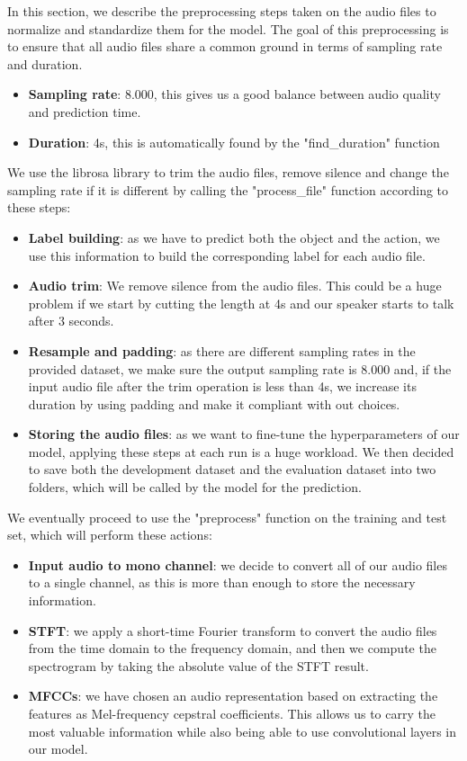 \documentclass[conference]{IEEEtran}
\begin{document}
In this section, we describe the preprocessing steps taken on the audio files to normalize and standardize them for the model. The goal of this preprocessing is to ensure that all audio files share a common ground in terms of sampling rate and duration.
\begin{itemize}
\item 	\textbf{Sampling rate}: 8.000, this gives us a good balance between audio quality and prediction time.
\item 	\textbf{Duration}: 4s, this is automatically found by the "find\_duration" function
\end{itemize}
We use the librosa library to trim the audio files, remove silence and change the sampling rate if it is different by calling the "process\_file" function according to these steps:
\begin{itemize}
\item 	\textbf{Label building}: as we have to predict both the object and the action, we use this information to build the corresponding label for each audio file.
\item 	\textbf{Audio trim}: We remove silence from the audio files. This could be a huge problem if we start by cutting the length at 4s and our speaker starts to talk after 3 seconds.
\item 	\textbf{Resample and padding}: as there are different sampling rates in the provided dataset, we make sure the output sampling rate is 8.000 and, if the input audio file after the trim operation is less than 4s, we increase its duration by using padding and make it compliant with out choices.
\item 	\textbf{Storing the audio files}: as we want to fine-tune the hyperparameters of our model, applying these steps at each run is a huge workload. We then decided to save both the development dataset and the evaluation dataset into two folders, which will be called by the model for the prediction.
\end{itemize}
We eventually proceed to use the "preprocess" function on the training and test set, which will perform these actions:
\begin{itemize}
\item 	\textbf{Input audio to mono channel}: we decide to convert all of our audio files to a single channel, as this is more than enough to store the necessary information.
\item 	\textbf{STFT}: we apply a short-time Fourier transform to convert the audio files from the time domain to the frequency domain, and then we compute the spectrogram by taking the absolute value of the STFT result.
\item 	\textbf{MFCCs}: we have chosen an audio representation based on extracting the features as Mel-frequency cepstral coefficients. This allows us to carry the most valuable information while also being able to use convolutional layers in our model.
\end{itemize}
\end{document}
